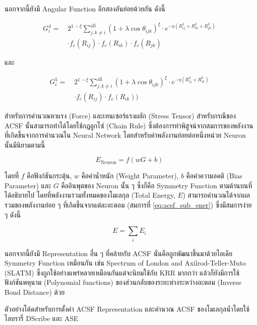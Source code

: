 นอกจากนี้ยังมี Angular Function อีกสองอันย่อยด้วยกัน ดังนี้

\begin{align}\label{eq:rf_g4}
    G^{4}_{i} =~&2^{1 - \xi}\sum^{\text{all}}_{j,k \neq i} (1+\lambda \cos \theta_{ijk})^{\xi}
    \cdot e^{-\eta(R^{2}_{ij} + R^{2}_{ik} + R^{2}_{jk})} \nonumber \\
    & \cdot f_{c}(R_{ij}) \cdot f_{c}(R_{ik}) \cdot f_{c}(R_{jk})
\end{align}

\noindent และ

\begin{align}\label{eq:rf_g5}
    G^{5}_{i} =~&2^{1 - \xi}\sum^{\text{all}}_{j,k \neq i} (1+\lambda \cos \theta_{ijk})^{\xi}
    \cdot e^{-\eta(R^{2}_{ij} + R^{2}_{ik})} \nonumber \\
    & \cdot f_{c}(R_{ij}) \cdot f_{c}(R_{ik}))
\end{align}

สำหรับการคำนวณหาแรง (Force) และเทนเซอร์แรงผลัก (Stress Tensor) สำหรับกรณีของ ACSF นั้นสามารถทำได้โดยใช้กฎลูกโซ่ (Chain 
Rule) ซึ่งต้องการทำพิสูจน์จากสมการของพลังงานที่เกิดขึ้นจากการคำนวณใน Neural Network โดยสำหรับค่าพลังงานย่อยต่อหนึ่งหน่วย Neuron 
นั้นมีนิยามตามนี้

\begin{equation}
    \label{eq:acsf_sub_ener}
    E_{\text{Neuron}} = f(w G + b) 
\end{equation}

\noindent โดยที่ $f$ คือฟังก์ชันกระตุ้น, $w$ คือค่าน้ำหนัก (Weight Parameter), $b$ คือค่าความอคติ (Bias Parameter) และ $G$ 
คืออินพุตของ Neuron นั้น ๆ ซึ่งก็คือ Symmetry Function ตามด้านบนที่ได้อธิบายไป โดยที่พลังงานรวมทั้งหมดของโมเลกุล (Total Energy, 
$E$) สามารถคำนวณได้จากผลรวมของพลังงานย่อย ๆ ที่เกิดขึ้นจากแต่ละอะตอม (สมการที่ \ref{eq:acsf_sub_ener}) ซึ่งมีสมการง่าย ๆ ดังนี้

\begin{equation}
    E = \sum_{i} E_{i}
\end{equation}

นอกจากนี้ยังมี Representation อื่น ๆ ที่คล้ายกับ ACSF นั่นคือถูกพัฒนาขึ้นมาด้วยไอเดีย Symmetry Function เหมือนกัน เช่น 
Spectrum of London and Axilrod-Teller-Muto (SLATM) ซึ่งถูกใช้อย่างแพร่หลายเหมือนกันแต่จะนิยมใช้กับ KRR มากกว่า%
\autocite{faber2018,huang2020} แล้วก็ยังมีการใช้ฟังก์ชันพหุนาม (Polynomial functions) ของส่วนกลับของระยะห่างระหว่างอะตอม
(Inverse Bond Distance) ด้วย\autocite{kwac2019,musil2021}

ตัวอย่างโค้ดสำหรับการตั้งค่า ACSF Representation และคำนวณ ACSF ของโมเลกุลน้ำโดยใช้ไลบรารี่ DScribe และ ASE

